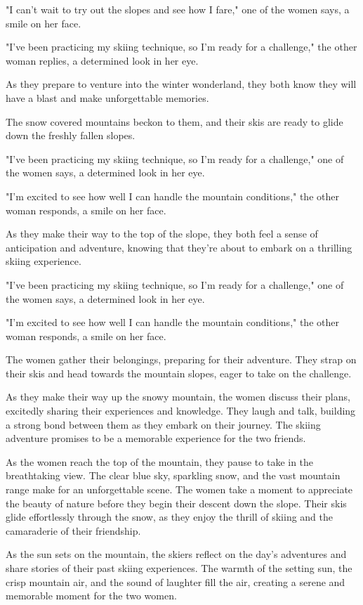 \documentclass[smalldemyvopaper,11pt,twoside,onecolumn,openright,extrafontsizes]{memoir}
\begin{document}
"I can't wait to try out the slopes and see how I fare," one of the women says, a smile on her face.\par
"I've been practicing my skiing technique, so I'm ready for a challenge," the other woman replies, a determined look in her eye.\par
As they prepare to venture into the winter wonderland, they both know they will have a blast and make unforgettable memories.\par
The snow covered mountains beckon to them, and their skis are ready to glide down the freshly fallen slopes.\par
"I've been practicing my skiing technique, so I'm ready for a challenge," one of the women says, a determined look in her eye.\par
"I'm excited to see how well I can handle the mountain conditions," the other woman responds, a smile on her face.\par
As they make their way to the top of the slope, they both feel a sense of anticipation and adventure, knowing that they're about to embark on a thrilling skiing experience.\par
"I've been practicing my skiing technique, so I'm ready for a challenge," one of the women says, a determined look in her eye.\par
"I'm excited to see how well I can handle the mountain conditions," the other woman responds, a smile on her face.\par
The women gather their belongings, preparing for their adventure. They strap on their skis and head towards the mountain slopes, eager to take on the challenge.\par
As they make their way up the snowy mountain, the women discuss their plans, excitedly sharing their experiences and knowledge. They laugh and talk, building a strong bond between them as they embark on their journey. The skiing adventure promises to be a memorable experience for the two friends.\par
As the women reach the top of the mountain, they pause to take in the breathtaking view. The clear blue sky, sparkling snow, and the vast mountain range make for an unforgettable scene. The women take a moment to appreciate the beauty of nature before they begin their descent down the slope. Their skis glide effortlessly through the snow, as they enjoy the thrill of skiing and the camaraderie of their friendship.\par
As the sun sets on the mountain, the skiers reflect on the day's adventures and share stories of their past skiing experiences. The warmth of the setting sun, the crisp mountain air, and the sound of laughter fill the air, creating a serene and memorable moment for the two women.\par
\end{document}
